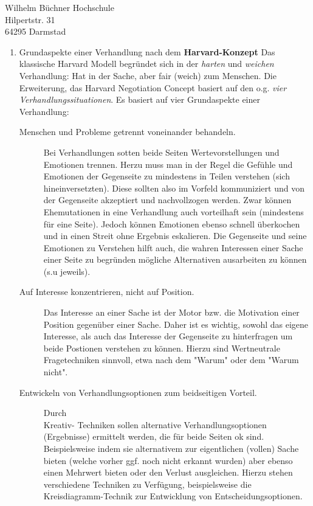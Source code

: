 \documentclass[
    version=last,           %
    DIV=13,                 %
    BCOR=0mm,               %
    paper=a4,               %
    fontsize=12pt,          %
    firsthead=on,           %
    firstfoot=on,           %
    pagenumber=on,i         %
    parskip=half,           %
    enlargefirstpage=,      %
    firsthead=on,           %
    fromrule=afteraddress,  %
    priority=off,           %
    backaddress=true,       %
    refline=dateright,      %
	fromalign=right,	    %
    fromemail=on,i          %
    fromurl=on,             %
    frombank=on,
    fromphone=on,           %
    frommobilephone=on      %
    fromlogo=on,            %
    addrfield=on,           %
    subject=untitled,  %
    foldmarks=off,          %
    numericaldate=off,      %
	pagenumber=right,	        %
	parskip=half,	        %
    headsep=false,          %
    footsepline=true,       %
    foldmarks=off,		    %
	]{scrlttr2}
\begin{document}
\begin{letter} {Wilhelm Büchner Hochschule \\
Hilpertstr. 31\\
64295 Darmstad}
\begin{itemize}
\begin{enumerate}
            \vspace{1cm}
            \item Grundaspekte einer Verhandlung nach dem \textbf{ Harvard-Konzept}
                Das klassische Harvard Modell begründet sich in der
                \textit{harten} und \textit{weichen} Verhandlung: Hat in der
                Sache, aber fair (weich) zum Menschen. Die Erweiterung, das
                Harvard Negotiation Concept basiert auf den o.g. \textit{vier
                Verhandlungssituationen}. Es basiert auf vier Grundaspekte einer
                Verhandlung:
                \begin{description}
                \item [Menschen und Probleme getrennt voneinander behandeln.]
                    Bei Verhandlungen sotten beide Seiten Wertevorstellungen
                    und Emotionen trennen. Herzu muss man in
                    der Regel die Gefühle und Emotionen der Gegenseite zu
                    mindestens in Teilen verstehen (sich hineinversetzten).
                    Diese sollten also im Vorfeld kommuniziert und von der
                    Gegenseite akzeptiert und nachvollzogen werden.
                    Zwar können Ehemutationen in eine Verhandlung auch
                    vorteilhaft sein (mindestens für eine Seite). Jedoch können
                    Emotionen ebenso schnell überkochen und in einen Streit ohne
                    Ergebnis eskalieren. Die Gegenseite und seine Emotionen zu
                    Verstehen hilft auch, die wahren Interessen einer Sache einer
                    Seite zu begründen mögliche Alternativen ausarbeiten zu
                    können (s.u jeweils).

                \item [Auf Interesse konzentrieren, nicht auf Position.]
                    Das Interesse an einer Sache ist der Motor bzw. die
                    Motivation einer Position gegenüber einer Sache.  Daher ist
                    es wichtig, sowohl das eigene Interesse, als auch das
                    Interesse der Gegenseite zu hinterfragen um
                    beide Postionen verstehen zu können. Hierzu sind
                    Wertneutrale Fragetechniken sinnvoll, etwa nach dem "Warum"
                    oder dem "Warum nicht".
                \item [Entwickeln von Verhandlungsoptionen zum beidseitigen Vorteil.]
                    Durch \\ Kreativ- Techniken sollen alternative
                    Verhandlungsoptionen (Ergebnisse) ermittelt werden, die für
                    beide Seiten ok sind. Beispielsweise indem sie alternativem
                    zur eigentlichen (vollen) Sache bieten (welche vorher ggf.
                    noch nicht erkannt wurden) aber ebenso einen Mehrwert bieten
                    oder den Verlust ausgleichen. Hierzu stehen verschiedene
                    Techniken zu Verfügung, beispielsweise die
                    Kreisdiagramm-Technik zur Entwicklung von Entscheidungsoptionen.


\end{description}
\end{enumerate}
\end{itemize}
\end{letter}
\end{document}
